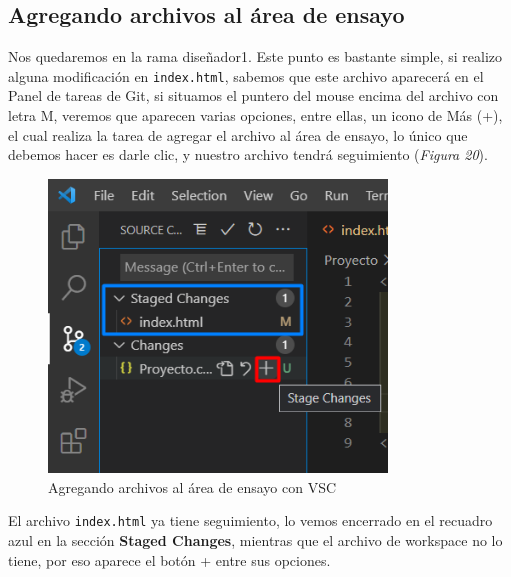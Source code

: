 \subsection{Agregando archivos al área de ensayo}
\hspace{0.55cm}Nos quedaremos en la rama diseñador1. Este punto es bastante simple, si realizo alguna modificación en \texttt{index.html}, sabemos que este archivo aparecerá en el Panel de tareas de Git, si situamos el puntero del mouse encima del archivo con letra M, veremos que aparecen varias opciones, entre ellas, un icono de Más (+), el cual realiza la tarea de agregar el archivo al área de ensayo, lo único que debemos hacer es darle clic, y nuestro archivo tendrá seguimiento (\textit{Figura 20}).
\begin{figure}[H]
    \begin{center}
        \caption{Agregando archivos al área de ensayo con VSC}
        \label{fig: 20}
        \includegraphics[width=9cm]{capturas/seguimiento_archivos.png}
    \end{center}
\end{figure}

El archivo \texttt{index.html} ya tiene seguimiento, lo vemos encerrado en el recuadro azul en la sección \textbf{Staged Changes}, mientras que el archivo de workspace no lo tiene, por eso aparece el botón + entre sus opciones.



